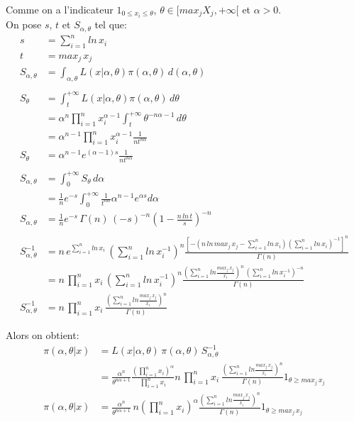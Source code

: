 \documentclass[
  12pt,
]{scrreprt}
\begin{document}
Comme on a l'indicateur \({1}_{0 \leq x_i \leq \theta}\), \(\theta \in [max_j X_j, +\infty[\) et \(\alpha > 0\).\\
On pose \(s\), \(t\) et \(S_{\alpha,\theta}\) tel que:
\[\begin{aligned}
s &= \sum_{i=1}^n ln\,x_i\\
t &= max_j \,x_j\\
S_{\alpha,\theta} &= \int_{\alpha,\theta} L(x|\alpha,\theta)\pi(\alpha,\theta) \,d(\alpha,\theta)\\
&\\
S_{\theta} &= \int_t^{+\infty} L(x|\alpha,\theta)\pi(\alpha,\theta) \,d\theta\\
&=\alpha^n\prod_{i=1}^n x_i^{\alpha-1} \int_t^{+\infty}\theta^{-n\alpha-1}\,d\theta\\
&=\alpha^{n-1}\prod_{i=1}^n x_i^{\alpha-1} \frac{1}{nt^{n\alpha}}\\
S_{\theta} &= \alpha^{n-1} e^{(\alpha-1)s} \frac{1}{nt^{n\alpha}}\\
&\\
S_{\alpha,\theta} &= \int_0^{+\infty} S_{\theta}\,d\alpha\\
&= \frac{1}{n} e^{-s} \int_0^{+\infty} \frac{1}{t^{n\alpha}}\alpha^{n-1} e^{\alpha s} d\alpha\\
S_{\alpha,\theta} &= \frac{1}{n} e^{-s} \,\Gamma(n)\,(-s)^{-n}\left (1-\frac{n\,ln\,t}{s}\right )^{-n}\\
&\\
S_{\alpha,\theta}^{-1} &= n\,e^{\sum_{i=1}^n ln\,x_i}\,\left (\sum_{i=1}^n ln\,x_i^{-1}\right )^n \frac{\left [-\left(n\,ln\,max_j\,x_j - \sum_{i=1}^n ln\,x_i \right ) \left(\sum_{i=1}^n ln\,x_i\right )^{-1} \right ]^n}{\Gamma(n)}\\
&= n\,\prod_{i=1}^n x_i \,\left (\sum_{i=1}^n ln\,x_i^{-1}\right )^n \frac{\left(\sum_{i=1}^n ln \frac{max_j\,x_j}{x_i}  \right)^n \,\left (\sum_{i=1}^n ln\,x_i^{-1}\right )^{-n}}{\Gamma(n)}\\
S_{\alpha,\theta}^{-1} &= n\,\prod_{i=1}^n x_i\, \frac{\left(\sum_{i=1}^n ln \frac{max_j\,x_j}{x_i}  \right)^n}{\Gamma(n)}
\end{aligned}\]

Alors on obtient:
\[\begin{aligned}
\pi(\alpha,\theta|x) &= L(x|\alpha,\theta)\,\pi(\alpha,\theta)\,S_{\alpha,\theta}^{-1}\\
&=\frac{\alpha^n}{\theta^{n\alpha+1}} \frac{\left (\prod_{i=1}^n x_i\right )^\alpha}{\prod_{i=1}^n x_i}n\,\prod_{i=1}^n x_i\, \frac{\left(\sum_{i=1}^n ln \frac{max_j\,x_j}{x_i}  \right)^n}{\Gamma(n)}{1}_{\theta \geq max_j\,x_j}\\
\pi(\alpha,\theta|x) &=\frac{\alpha^n}{\theta^{n\alpha+1}}\, n\left (\prod_{i=1}^n x_i\right )^\alpha \frac{\left(\sum_{i=1}^n ln \frac{max_j\,x_j}{x_i}  \right)^n}{\Gamma(n)}{1}_{\theta \geq max_j\,x_j}
\end{aligned}\]
\end{document}
